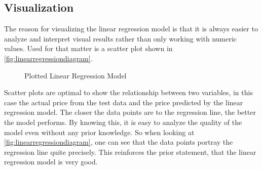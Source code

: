 \subsection{Visualization}
The reason for visualizing the linear regression model is that it is always easier to analyze and interpret visual 
results rather than only working with numeric values.
Used for that matter is a scatter plot shown in \autoref{fig:linearregressiondiagram}. 
\begin{figure}[h]
    \caption{Plotted Linear Regression Model}
    \label{fig:linearregressiondiagram}
\end{figure}
\par
Scatter plots are optimal to show the relationship between two variables, in this case the actual price from the test data 
and the price predicted by the linear regression model. The closer the data points are to the regression line, the 
better the model performs. By knowing this, it is easy to analyze the quality of the model even without any prior knowledge.
So when looking at \autoref{fig:linearregressiondiagram}, one can see that the data points portray the regression line 
quite precisely. This reinforces the prior statement, that the linear regression model is very good.

